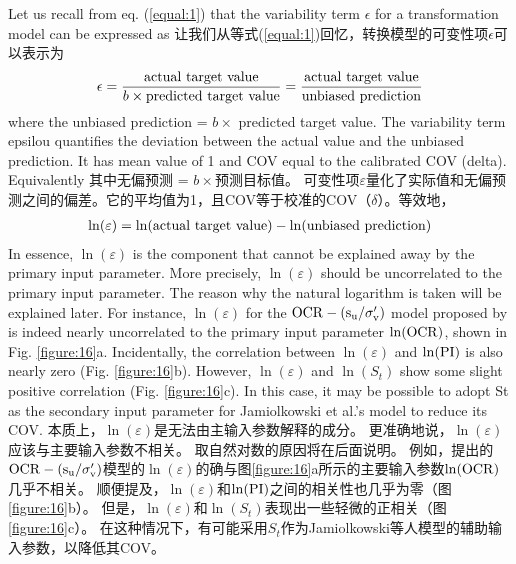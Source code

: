 
\begin{Parallel}{0.60\textwidth}{}
    \ParallelLText
    {
        Let us recall from eq. (\ref{equal:1}) that the variability term $\epsilon$ for a  transformation model can be expressed as
    }
    \ParallelRText
    {
        让我们从等式(\ref{equal:1})回忆，转换模型的可变性项$\epsilon$可以表示为
    }
    \ParallelPar
    \begin{align}
        \epsilon=\dfrac{\rm{actual~target~value}}{b\times{}\rm{predicted~target~value}}=\dfrac{\rm{actual~target~value}}{\rm{unbiased~prediction}}
        \label{equal:2}
    \end{align}
    \ParallelLText
    {
        where the unbiased prediction = $b\times$ predicted target value. The variability term epsilou quantifies the deviation between the actual value and the unbiased prediction. It has mean value of 1 and COV equal to the calibrated COV (delta). Equivalently
    }
    \ParallelRText
    {
        其中无偏预测 = $b\times$预测目标值。 可变性项$\varepsilon$量化了实际值和无偏预测之间的偏差。它的平均值为1，且COV等于校准的COV（$\delta$）。等效地，
    }
    \ParallelPar
    \begin{align}
        \ln(\varepsilon)=\ln(\rm{actual~target~value})-\ln({\rm{unbiased~prediction}})
        \label{equal:3}
    \end{align}
    \ParallelLText
    {
        In essence, $\ln(\varepsilon)$ is the component that cannot be explained away by the primary input parameter. More precisely, $\ln(\varepsilon)$ should be uncorrelated to the primary input parameter. The reason why the natural logarithm is taken will be explained later. For instance, $\ln(\varepsilon)$ for the $\rm{OCR}-(s_u/\sigma_v')$ model proposed by \citet{Jamiolkowski198557} is indeed nearly uncorrelated to the primary input parameter $\ln(\rm{OCR})$, shown in Fig. \ref{figure:16}a. Incidentally, the correlation between $\ln(\varepsilon)$ and $\ln(\rm{PI})$ is also nearly zero (Fig. \ref{figure:16}b). However, $\ln(\varepsilon)$ and $\ln(S_t)$ show some slight positive correlation (Fig. \ref{figure:16}c). In this case, it may be possible to adopt St as the secondary input parameter for Jamiolkowski et al.’s model to reduce its COV.
    }
    \ParallelRText
    {
        本质上，$\ln(\varepsilon)$是无法由主输入参数解释的成分。 更准确地说，$\ln(\varepsilon)$应该与主要输入参数不相关。 取自然对数的原因将在后面说明。 例如，\citet{Jamiolkowski198557}提出的$\rm{OCR}-(s_u/\sigma_v')$模型的$\ln(\varepsilon)$的确与图\ref{figure:16}a所示的主要输入参数$\ln(\rm{OCR})$几乎不相关。 顺便提及，$\ln(\varepsilon)$和$\ln(\rm{PI})$之间的相关性也几乎为零（图\ref{figure:16}b）。 但是，$\ln(\varepsilon)$和$\ln(S_t)$表现出一些轻微的正相关（图\ref{figure:16}c）。 在这种情况下，有可能采用$S_t$作为Jamiolkowski等人模型的辅助输入参数，以降低其COV。
}
\end{Parallel}
